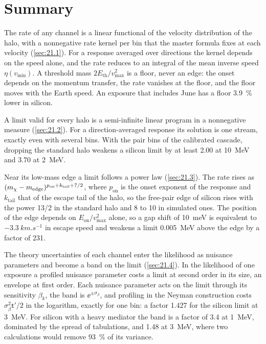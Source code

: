 \section*{Summary}

The rate of any channel is a linear functional of the velocity distribution of the halo, with a nonnegative rate kernel per bin that the master formula fixes at each velocity (\cref{sec:21.1}). For a response averaged over directions the kernel depends on the speed alone, and the rate reduces to an integral of the mean inverse speed $\eta(v_{\mathrm{min}})$. A threshold mass $2E_{\mathrm{th}}/v_{\mathrm{max}}^2$ is a floor, never an edge: the onset depends on the momentum transfer, the rate vanishes at the floor, and the floor moves with the Earth speed. An exposure that includes June has a floor \SI{3.9}{\percent} lower in silicon.

A limit valid for every halo is a semi-infinite linear program in a nonnegative measure (\cref{sec:21.2}). For a direction-averaged response its solution is one stream, exactly even with several bins. With the pair bins of the calibrated cascade, dropping the standard halo weakens a silicon limit by at least 2.00 at \SI{10}{MeV} and 3.70 at \SI{2}{MeV}.

Near its low-mass edge a limit follows a power law (\cref{sec:21.3}). The rate rises as $(m_{\chi} - m_{\mathrm{edge}})^{p_{\mathrm{on}} + k_{\mathrm{tail}} + 7/2}$, where $p_{\mathrm{on}}$ is the onset exponent of the response and $k_{\mathrm{tail}}$ that of the escape tail of the halo, so the free-pair edge of silicon rises with the power 13/2 in the standard halo and 8 to 10 in simulated ones. The position of the edge depends on $E_{\mathrm{on}}/v_{\mathrm{max}}^2$ alone, so a gap shift of \SI{10}{meV} is equivalent to $-\SI{3.3}{km.s^{-1}}$ in escape speed and weakens a limit \SI{0.005}{MeV} above the edge by a factor of 231.

The theory uncertainties of each channel enter the likelihood as nuisance parameters and become a band on the limit (\cref{sec:21.4}). In the likelihood of one exposure a profiled nuisance parameter costs a limit at second order in its size, an envelope at first order. Each nuisance parameter acts on the limit through its sensitivity $\beta_k$, the band is $\ee^{\pm\sigma_\beta}$, and profiling in the Neyman construction costs $\sigma_\beta^2\mathsf{t}'/2$ in the logarithm, exactly for one bin: a factor 1.427 for the silicon limit at \SI{3}{MeV}. For silicon with a heavy mediator the band is a factor of 3.4 at \SI{1}{MeV}, dominated by the spread of tabulations, and 1.48 at \SI{3}{MeV}, where two calculations would remove \SI{93}{\percent} of its variance.

